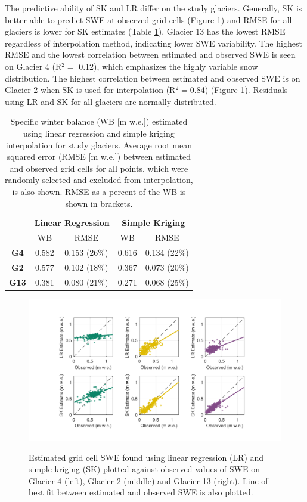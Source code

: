 \documentclass[twocolumn, letterpaper]{igs}
\begin{document}
The predictive ability of SK and LR differ on the study glaciers. Generally, SK is better able to predict SWE at observed grid cells (Figure \ref{fig:observedVSestimated_S2}) and RMSE for all glaciers is lower for SK estimates (Table \ref{tab:WSMB&RMSE}). Glacier 13 has the lowest RMSE regardless of interpolation method, indicating lower SWE variability. The highest RMSE and the lowest correlation between estimated and observed SWE is seen on Glacier 4 (R$^2=$ 0.12), which emphasizes the highly variable snow distribution. The highest correlation between estimated and observed SWE is on Glacier 2 when SK is used for interpolation (R$^2=$0.84) (Figure \ref{fig:observedVSestimated_S2}). Residuals using LR and SK for all glaciers are normally distributed.

\begin{table}[]
\centering
\caption{Specific winter balance (WB [m w.e.]) estimated using linear regression and simple kriging interpolation for study glaciers. Average root mean squared error (RMSE [m w.e.]) between estimated and observed grid cells for all points, which were randomly selected and excluded from interpolation, is also shown. RMSE as a percent of the WB is shown in brackets.}
\label{tab:WSMB&RMSE}
\begin{tabular}{ccccc}
 & \multicolumn{2}{c}{\textbf{Linear Regression}} & \multicolumn{2}{c}{\textbf{Simple Kriging}} \\
 & WB & RMSE & WB & RMSE \\
  \midrule
\textbf{G4} & 0.582 & 0.153 (26\%) & 0.616 & 0.134 (22\%) \\
 \midrule
\textbf{G2} & 0.577 & 0.102 (18\%) & 0.367 & 0.073 (20\%) \\
 \midrule
\textbf{G13} & 0.381 & 0.080 (21\%) & 0.271 & 0.068 (25\%)
\end{tabular}
\end{table}

\begin{figure}
	\centering
	\includegraphics[width =\textwidth]{observedVSestimated_S2.pdf}\\
	\caption{Estimated grid cell SWE found using linear regression (LR) and simple kriging (SK) plotted against observed values of SWE on Glacier 4 (left), Glacier 2 (middle) and Glacier 13 (right). Line of best fit between estimated and observed SWE is also plotted.}
	\label{fig:observedVSestimated_S2}
\end{figure}
\end{document}
